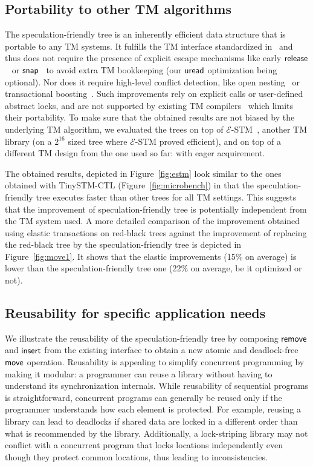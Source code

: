 \subsection{Portability to other TM algorithms}\label{ssec:othertms}

The speculation-friendly tree is an inherently efficient data structure that is portable to any TM systems.
It fulfills the TM interface standardized in~\cite{abi} and thus does not require the presence of explicit
escape mechanisms like early $\lit{release}$~\cite{HLMS03} or $\lit{snap}$~\cite{CH05} to avoid extra TM bookkeeping 
(our $\act{uread}$ optimization being optional).
Nor does it require high-level conflict detection, like open nesting~\cite{Mos06,NMA+07,ALS09} or transactional boosting~\cite{HK08}. Such improvements rely on 
explicit calls or user-defined abstract locks, and are not supported by existing TM compilers~\cite{abi} which limits their portability.
%
To make sure that the obtained results are not biased by the underlying TM algorithm,
we evaluated the trees on top of ${\mathcal E}$-STM~\cite{FGG09}, another TM library (on a $2^{16}$ sized tree where ${\mathcal E}$-STM proved efficient),
and on top of a different TM design from the one used so far: with eager acquirement.

The obtained results, depicted in Figure~\ref{fig:estm} look similar to the ones obtained with TinySTM-CTL
(Figure~\ref{fig:microbench}) in that the speculation-friendly tree executes faster than other trees for all TM settings.
This suggests that the improvement of speculation-friendly tree 
is potentially independent from the TM system used.
A more detailed comparison of the improvement obtained
using elastic transactions on red-black trees against the improvement of replacing the red-black tree by the speculation-friendly tree
is depicted in Figure~\ref{fig:move1}. It shows that the elastic improvements (15\% on average) is lower than the 
speculation-friendly tree one (22\% on average, be it optimized or not). 

\subsection{Reusability for specific application needs}

We illustrate the reusability of the speculation-friendly tree by composing $\act{remove}$ and $\act{insert}$ from the existing interface to obtain a new
atomic and deadlock-free $\act{move}$ operation.
Reusability is appealing to simplify concurrent programming by making it modular:
a programmer can reuse a library without having to understand its synchronization internals.
While reusability of sequential programs is straightforward, concurrent programs can generally be reused only 
if the programmer understands how each element is protected. For example, reusing a library can lead to deadlocks
if shared data are locked in a different order than what is recommended by the library. Additionally, a lock-striping library
may not conflict with a concurrent program that locks locations independently even though they protect common locations, 
thus leading to inconsistencies.

